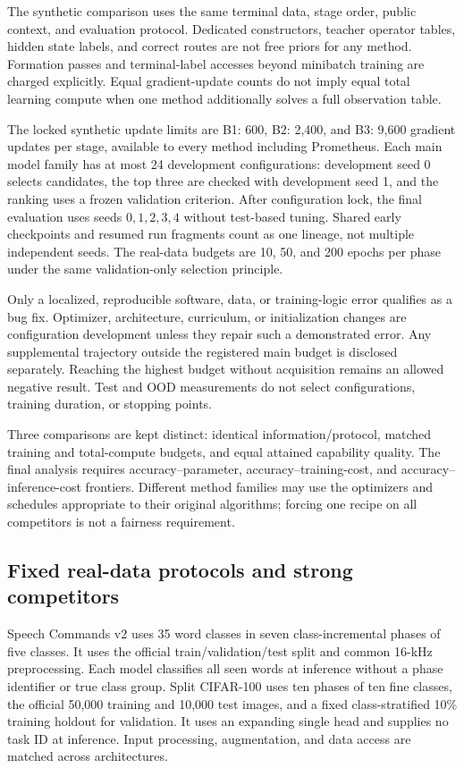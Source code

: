 The synthetic comparison uses the same terminal data, stage order, public
context, and evaluation protocol. Dedicated constructors, teacher operator
tables, hidden state labels, and correct routes are not free priors for any
method. Formation passes and terminal-label accesses beyond minibatch training
are charged explicitly. Equal gradient-update counts do not imply equal total
learning compute when one method additionally solves a full observation table.

The locked synthetic update limits are B1: 600, B2: 2,400, and B3: 9,600
gradient updates per stage, available to every method including Prometheus.
Each main model family has at most 24 development configurations: development
seed 0 selects candidates, the top three are checked with development seed 1,
and the ranking uses a frozen validation criterion. After configuration lock,
the final evaluation uses seeds $0,1,2,3,4$ without test-based tuning. Shared
early checkpoints and resumed run fragments count as one lineage, not multiple
independent seeds. The real-data budgets are 10, 50, and 200 epochs per phase
under the same validation-only selection principle.

Only a localized, reproducible software, data, or training-logic error qualifies
as a bug fix. Optimizer, architecture, curriculum, or initialization changes
are configuration development unless they repair such a demonstrated error.
Any supplemental trajectory outside the registered main budget is disclosed
separately. Reaching the highest budget without acquisition remains an allowed
negative result. Test and OOD measurements do not select configurations,
training duration, or stopping points.

Three comparisons are kept distinct: identical information/protocol, matched
training and total-compute budgets, and equal attained capability quality.
The final analysis requires accuracy--parameter, accuracy--training-cost, and
accuracy--inference-cost frontiers. Different method families may use the
optimizers and schedules appropriate to their original algorithms; forcing one
recipe on all competitors is not a fairness requirement.

\subsection{Fixed real-data protocols and strong competitors}

Speech Commands v2 uses 35 word classes in seven class-incremental phases of
five classes. It uses the official train/validation/test split and common
16-kHz preprocessing. Each model classifies all seen words at inference
without a phase identifier or true class group. Split CIFAR-100 uses ten phases
of ten fine classes, the official 50,000 training and 10,000 test images, and a
fixed class-stratified 10\% training holdout for validation. It uses an expanding
single head and supplies no task ID at inference. Input processing,
augmentation, and data access are matched across architectures.

